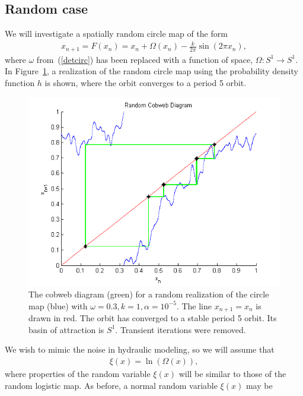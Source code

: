 \subsection{Random case}
We will investigate a spatially random circle map of the form
\begin{align}\label{randcirc}
x_{n+1}= F(x_n) =  x_n + \Omega(x_n) - \frac{k}{2\pi}\sin(2\pi x_n),
\end{align}
where $\omega$ from~(\ref{detcirc}) has been replaced with a function
of space, $\Omega:S^1\to S^1$. In Figure~\ref{fig:rcircstable}, a realization of the
random circle map using the probability density function $h$ is shown,
where the orbit converges to a period 5 orbit. 
\begin{figure}[!h]
\caption[Random circle map, stable orbit]{The cobweb
  diagram (green) for a random realization of the circle map (blue) with $\omega =
  0.3, k=1, \alpha = 10^{-5}$. The line $x_{n+1}=x_n$ is drawn in red. The orbit
  has converged to a stable period 5 orbit. Its basin of attraction is
  $S^1$. Transient iterations were removed.}\label{fig:rcircstable}
	\begin{center}
		\includegraphics[scale=0.7]{figs/randcirc_cobweb.png}
	\end{center}
\end{figure}
We wish to mimic the noise in hydraulic modeling, so we
will assume that
\begin{align}\label{Omega}
\xi(x) = \ln(\Omega(x)),
\end{align}
where properties of the random variable $\xi(x)$ will be similar to those of the random logistic map. As before, a normal random variable $\xi(x)$ may be
